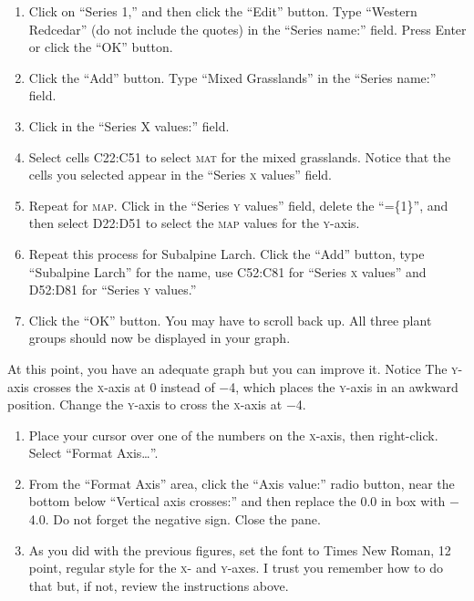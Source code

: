 \documentclass[12pt, hidelinks]{exam}
\newcommand*\axis[1]{{\scshape #1}-axis}
\begin{document}
\begin{questions}
\begin{enumerate}[resume]
	\item Click on “Series 1,” and then click the “Edit” button. Type “Western Redcedar” (do not include the quotes) in the “Series name:” field. Press Enter or click the “OK” button.

	\item Click the “Add” button. Type “Mixed Grasslands” in the “Series name:” field.

	\item Click in the “Series X values:” field.

	\item Select cells {\liningnum C22:C51} to select \textsc{mat} for the mixed grasslands. Notice that the cells you selected appear in the “Series \textsc{x} values” field.

	\item Repeat for \textsc{map}. Click in the “Series \textsc{y} values” field, delete the “=\{1\}”, and then select {\liningnum D22:D51} to select the \textsc{map} values for the \axis{y}. 

	\item Repeat this process for Subalpine Larch. Click the “Add” button, type “Subalpine Larch” for the name, use {\liningnum C52:C81} for “Series \textsc{x} values” and D52:D81 for “Series \textsc{y} values.” 

	\item Click the “OK” button. You may have to scroll back up. All three plant groups should now be displayed in your graph. 
\end{enumerate}

At this point, you have an adequate graph but you can improve it. Notice The \axis{y} crosses the \axis{x} at 0 instead of $-$4, which places the \axis{y} in an awkward position. Change the \axis{y} to cross the \axis{x} at $-$4.

\begin{enumerate}[resume]
	\item Place your cursor over one of the numbers on the \axis{x}, then right-click. Select “Format Axis\dots”.

	\item From the “Format Axis” area, click the “Axis value:” radio button, near the bottom below “Vertical axis crosses:” and then replace the 0.0 in box with $-$4.0. Do not forget the negative sign. Close the pane.

	\item As you did with the previous figures, set the font to Times New Roman, 12 point, regular style for the \textsc{x}- and \textsc{y}-axes. I trust you remember how to do that but, if not, review the instructions above.
	

\end{enumerate}
\end{questions}
\end{document}
